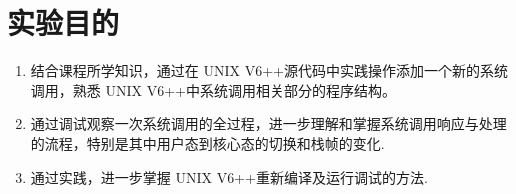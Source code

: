 \section{实验目的}
\begin{enumerate}
    \item 结合课程所学知识，通过在 UNIX V6++源代码中实践操作添加一个新的系统调用，熟悉 UNIX V6++中系统调用相关部分的程序结构。
    \item 通过调试观察一次系统调用的全过程，进一步理解和掌握系统调用响应与处理的流程，特别是其中用户态到核心态的切换和栈帧的变化.
    \item 通过实践，进一步掌握 UNIX V6++重新编译及运行调试的方法.
\end{enumerate}